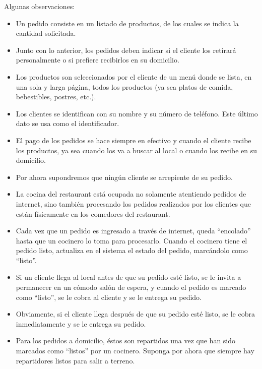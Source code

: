 \documentclass[11pt,letterpaper]{article}
\begin{document}
\begin{spacing}{1.2}
\begin{Problem}
    Algunas observaciones:
    \begin{itemize}[itemsep=0pt,topsep=0pt]
        \item Un pedido consiste en un listado de productos, de los cuales se indica la cantidad solicitada.
        \item Junto con lo anterior, los pedidos deben indicar si el cliente
            los retirará personalmente o si prefiere recibirlos en su domicilio.
        \item Los productos son seleccionados por el cliente de un menú donde se lista, en una sola y larga
            página, todos los productos (ya sea platos de comida, bebestibles, postres, etc.).
        \item Los clientes se identifican con su nombre y su número de teléfono. Este último dato
            se usa como el identificador.
        \item El pago de los pedidos se hace siempre en efectivo y 
            cuando el cliente recibe los productos, ya sea cuando los
    va a buscar al local o cuando los recibe en su domicilio.
        \item Por ahora supondremos que ningún cliente se arrepiente de su pedido.
        \item La cocina del restaurant está ocupada no solamente atentiendo pedidos
            de internet, sino también procesando los pedidos realizados por los clientes 
            que están físicamente en los comedores del restaurant.
        \item Cada vez que un pedido es ingresado a través de internet, queda ``encolado''
            hasta que un cocinero lo toma para procesarlo. Cuando el cocinero tiene el
            pedido listo, actualiza en el sistema el estado del pedido, marcándolo como ``listo''.
        \item Si un cliente llega al local antes de que su pedido esté listo, se le invita a
            permanecer en un cómodo salón de espera, y cuando el pedido es marcado como ``listo'',
            se le cobra al cliente y se le entrega su pedido.
        \item Obviamente, si el cliente llega después de que su pedido esté listo, se le cobra
            inmediatamente y se le entrega su pedido.
        \item Para los pedidos a domicilio, éstos son repartidos una vez que han sido marcados
            como ``listos'' por un cocinero. Suponga por ahora que siempre hay repartidores
            listos para salir a terreno.
    \end{itemize}


\end{Problem}
\end{spacing}
\end{document}
